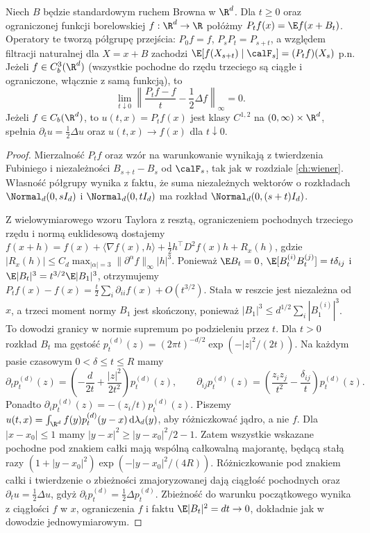 \begin{twierdzenie}
\label{thm:brown-multi-generator}
Niech $B$ będzie standardowym ruchem Browna w $\R^d$.
Dla $t\ge0$ oraz ograniczonej funkcji borelowskiej
$f:\R^d\to\R$ połóżmy $P_tf(x)=\E f(x+B_t)$.
Operatory te tworzą półgrupę przejścia: $P_0f=f$,
$P_sP_t=P_{s+t}$, a względem filtracji naturalnej
dla $X=x+B$ zachodzi
$\E[f(X_{s+t})\mid\calF_s]=(P_tf)(X_s)$ p.n.
Jeżeli $f\in C_b^3(\R^d)$ (wszystkie pochodne do rzędu trzeciego
są ciągłe i ograniczone, włącznie z samą funkcją), to
\[
\lim_{t\downarrow0}\left\|\frac{P_tf-f}{t}-\frac12\Delta f
\right\|_\infty=0.
\]
Jeżeli $f\in C_b(\R^d)$, to $u(t,x)=P_tf(x)$ jest klasy
$C^{1,2}$ na $(0,\infty)\times\R^d$, spełnia
$\partial_tu=\frac12\Delta u$ oraz $u(t,x)\to f(x)$ dla $t\downarrow0$.
\end{twierdzenie}
\begin{proof}
Mierzalność $P_tf$ oraz wzór na warunkowanie
wynikają z twierdzenia Fubiniego i niezależności
$B_{s+t}-B_s$ od $\calF_s$, tak jak w rozdziale
\ref{ch:wiener}. Własność półgrupy wynika z faktu,
że suma niezależnych wektorów o rozkładach
$\Normal_d(0,sI_d)$ i $\Normal_d(0,tI_d)$
ma rozkład $\Normal_d(0,(s+t)I_d)$.

Z wielowymiarowego wzoru Taylora z resztą, ograniczeniem
pochodnych trzeciego rzędu i normą euklidesową dostajemy
$f(x+h)=f(x)+\langle\nabla f(x),h\rangle+
\frac12 h^\top D^2f(x)h+R_x(h)$, gdzie
$|R_x(h)|\le C_d\max_{|\alpha|=3}\|\partial^\alpha f\|_\infty|h|^3$.
Ponieważ $\E B_t=0$,
$\E[B_t^{(i)}B_t^{(j)}]=t\delta_{ij}$ i
$\E|B_t|^3=t^{3/2}\E|B_1|^3$, otrzymujemy
$P_tf(x)-f(x)=\frac{t}{2}\sum_i\partial_{ii}f(x)+O(t^{3/2})$.
Stała w reszcie jest niezależna od $x$, a trzeci moment
normy $B_1$ jest skończony, ponieważ
$|B_1|^3\le d^{1/2}\sum_i|B_1^{(i)}|^3$.
To dowodzi granicy w normie supremum po podzieleniu przez $t$.
Dla $t>0$ rozkład $B_t$ ma gęstość
$p_t^{(d)}(z)=(2\pi t)^{-d/2}\exp(-|z|^2/(2t))$.
Na każdym pasie czasowym $0<\delta\le t\le R$ mamy
\[
\partial_t p_t^{(d)}(z)=
\left(-\frac d{2t}+\frac{|z|^2}{2t^2}\right)p_t^{(d)}(z),
\qquad
\partial_{ij}p_t^{(d)}(z)=
\left(\frac{z_i z_j}{t^2}-\frac{\delta_{ij}}{t}\right)p_t^{(d)}(z).
\]
Ponadto $\partial_i p_t^{(d)}(z)=-(z_i/t)p_t^{(d)}(z)$.
Piszemy $u(t,x)=\int_{\R^d} f(y)p_t^{(d)}(y-x)\,
\mathrm d\lambda_d(y)$, aby różniczkować jądro, a nie $f$.
Dla $|x-x_0|\le1$ mamy $|y-x|^2\ge |y-x_0|^2/2-1$.
Zatem wszystkie wskazane pochodne pod znakiem całki
mają wspólną całkowalną majorantę, będącą stałą razy
$(1+|y-x_0|^2)\exp(-|y-x_0|^2/(4R))$.
Różniczkowanie pod znakiem całki i twierdzenie o zbieżności
zmajoryzowanej dają ciągłość pochodnych oraz
$\partial_tu=\frac12\Delta u$, gdyż
$\partial_t p_t^{(d)}=\frac12\Delta p_t^{(d)}$.
Zbieżność do warunku początkowego wynika z ciągłości $f$ w $x$,
ograniczenia $f$ i faktu $\E|B_t|^2=dt\to0$, dokładnie jak
w dowodzie jednowymiarowym.
\end{proof}

